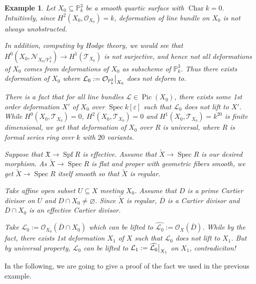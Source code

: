 \documentclass{ctexart}
\newtheorem{example}{Example}[section]
\newcommand{\characteristic}{\operatorname{Char}}
\newcommand{\spec}{\operatorname{Spec}}
\newcommand{\spf}{\operatorname{Spf}}
\newcommand{\picardscheme}{\operatorname{Pic}}
\begin{document}
\begin{example}
    Let $X_{0} \subseteq \mathbb{P}_{k}^{3}$ be a smooth quartic surface with $\characteristic k = 0$.
    Intuitively, since $H^{2}(X_{0}, \mathcal{O}_{X_{0}}) = k$, deformation of line bundle on $X_{0}$ is not always unobstructed.
    \par
    In addition, computing by Hodge theory, 
    we would see that $H^{0}(X_{0}, \mathcal{N}_{X_{0}/\mathbb{P}_{k}^{3}}) \rightarrow H^{1}(\mathcal{T}_{X_{0}})$ is not surjective,
    and hence not all deformations of $X_{0}$ comes from deformations of $X_{0}$ as subscheme of $\mathbb{P}_{k}^{3}$.
    Thus there exists deformation of $X_{0}$ where $\mathcal{L}_{0} := \mathcal{O}_{\mathbb{P}_{k}^{3}}\big{|}_{X_{0}}$ does not deform to.
    \par
    There is a fact that for all line bundles $\mathcal{L}\in \picardscheme(X_{0})$,
    there exists some 1st order deformation $X'$ of $X_{0}$ over $\spec k[\varepsilon]$ such that $\mathcal{L}_{0}$ does not lift to $X'$.
    While $H^{0}(X_{0}, \mathcal{T}_{X_{0}})= 0$, $H^{2}(X_{0}, \mathcal{T}_{X_{0}}) = 0$ and $H^{1}(X_{0}, \mathcal{T}_{X_{0}}) = k^{20}$ is finite dimensional,
    we get that deformation of $X_{0}$ over $R$ is universal, where $R$ is formal series ring over $k$ with $20$ variants.
    \par
    Suppose that $\mathfrak{X} \rightarrow \spf R$ is effective.
    Assume that $\widetilde{X} \rightarrow \spec R$ is our desired morphism.
    As $\widetilde{X} \rightarrow \spec R$ is flat and proper with geometric fibers smooth, 
    we get $\widetilde{X} \rightarrow \spec R$ itself smooth so that $\widetilde{X}$ is regular.
    \par
    Take affine open subset $U \subseteq X$ meeting $X_{0}$.
    Assume that $D$ is a prime Cartier divisor on $U$ and $D \cap X_{0} \neq \varnothing$.
    Since $\widetilde{X}$ is regular, $\overline{D}$ is a Cartier divisor and $\overline{D} \cap X_{0}$ is an effective Cartier divisor.
    \par
    Take $\mathcal{L}_{0} := \mathcal{O}_{X_{0}}(\overline{D} \cap X_{0})$ which can be lifted to $\widehat{\mathcal{L}_{0}} := \mathcal{O}_{X}(\overline{D})$.
    While by the fact, there exists 1st deformation $X_{1}$ of $X$ such that $\mathcal{L}_{0}$ does not lift to $X_{1}$.
    But by universal property, $\mathcal{L}_{0}$ can be lifted to $\mathcal{L}_{1} := \widehat{\mathcal{L}_{0}}\big{|}_{X_{1}}$ on $X_{1}$, contradiciton!
\end{example}
In the following, we are going to give a proof of the fact we used in the previous example.
\end{document}
